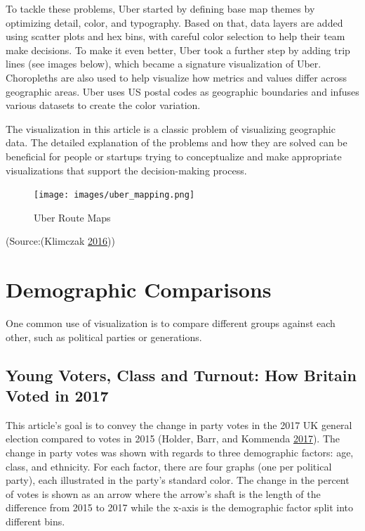\documentclass[]{book}
\begin{document}
To tackle these problems, Uber started by defining base map themes by optimizing detail, color, and typography. Based on that, data layers are added using scatter plots and hex bins, with careful color selection to help their team make decisions. To make it even better, Uber took a further step by adding trip lines (see images below), which became a signature visualization of Uber. Choropleths are also used to help visualize how metrics and values differ across geographic areas. Uber uses US postal codes as geographic boundaries and infuses various datasets to create the color variation.

The visualization in this article is a classic problem of visualizing geographic data. The detailed explanation of the problems and how they are solved can be beneficial for people or startups trying to conceptualize and make appropriate visualizations that support the decision-making process.

\begin{figure}
\centering
\texttt{[image: images/uber\_mapping.png]}
\caption{Uber Route Maps}
\end{figure}

(Source:(Klimczak \protect\hyperlink{ref-uber_maps}{2016}))

\hypertarget{demographic-comparisons}{%
\section{Demographic Comparisons}\label{demographic-comparisons}}

One common use of visualization is to compare different groups against each other, such as political parties or generations.

\hypertarget{young-voters-class-and-turnout-how-britain-voted-in-2017}{%
\subsection{Young Voters, Class and Turnout: How Britain Voted in 2017}\label{young-voters-class-and-turnout-how-britain-voted-in-2017}}

This article's goal is to convey the change in party votes in the 2017 UK general election compared to votes in 2015 (Holder, Barr, and Kommenda \protect\hyperlink{ref-UKvotes2017}{2017}). The change in party votes was shown with regards to three demographic factors: age, class, and ethnicity. For each factor, there are four graphs (one per political party), each illustrated in the party's standard color. The change in the percent of votes is shown as an arrow where the arrow's shaft is the length of the difference from 2015 to 2017 while the x-axis is the demographic factor split into different bins.
\end{document}
